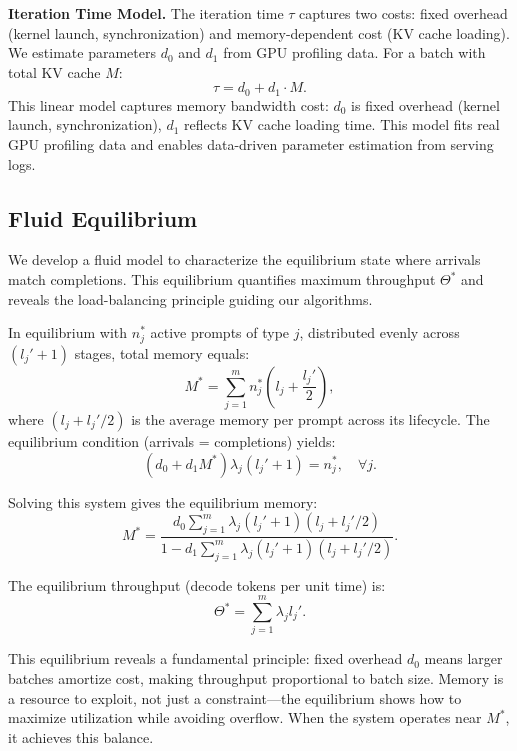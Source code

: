 \textbf{Iteration Time Model.} The iteration time $\tau$ captures two costs: fixed overhead (kernel launch, synchronization) and memory-dependent cost (KV cache loading). We estimate parameters $d_0$ and $d_1$ from GPU profiling data. For a batch with total KV cache $M$:
\begin{equation}
\label{eq:iteration_time}
\tau = d_0 + d_1 \cdot M.
\end{equation}
This linear model captures memory bandwidth cost: $d_0$ is fixed overhead (kernel launch, synchronization), $d_1$ reflects KV cache loading time. This model fits real GPU profiling data and enables data-driven parameter estimation from serving logs.

\subsection{Fluid Equilibrium}

We develop a fluid model to characterize the equilibrium state where arrivals match completions. This equilibrium quantifies maximum throughput $\Theta^*$ and reveals the load-balancing principle guiding our algorithms.

In equilibrium with $n_j^*$ active prompts of type $j$, distributed evenly across $(l_j'+1)$ stages, total memory equals:
\begin{equation}
\label{eq:memory_multi}
M^* = \sum_{j=1}^m n_j^* \left( l_j + \frac{l_j'}{2} \right),
\end{equation}
where $(l_j + l_j'/2)$ is the average memory per prompt across its lifecycle. The equilibrium condition (arrivals = completions) yields:
\begin{equation}
(d_0 + d_1 M^*) \lambda_j (l_j' + 1) = n_j^*, \quad \forall j.
\end{equation}

Solving this system gives the equilibrium memory:
\begin{equation}
\label{eq:equilibrium_memory}
M^* = \frac{d_0 \sum_{j=1}^m \lambda_j (l_j'+1)(l_j + l_j'/2)}{1 - d_1 \sum_{j=1}^m \lambda_j (l_j'+1)(l_j + l_j'/2)}.
\end{equation}

The equilibrium throughput (decode tokens per unit time) is:
\begin{equation}
\Theta^* = \sum_{j=1}^m \lambda_j l_j'.
\end{equation}

This equilibrium reveals a fundamental principle: fixed overhead $d_0$ means larger batches amortize cost, making throughput proportional to batch size. Memory is a resource to exploit, not just a constraint—the equilibrium shows how to maximize utilization while avoiding overflow. When the system operates near $M^*$, it achieves this balance.



